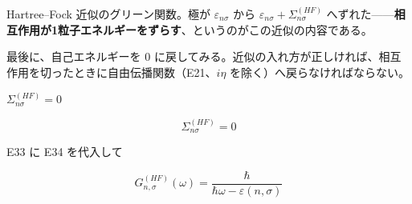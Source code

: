 \documentclass[dvipdfmx,a4paper,11pt]{jsarticle}
\begin{document}
Hartree–Fock 近似のグリーン関数。極が $\varepsilon_{n\sigma}$ から $\varepsilon_{n\sigma}+\Sigma^{(HF)}_{n\sigma}$ へずれた——\textbf{相互作用が1粒子エネルギーをずらす}、というのがこの近似の内容である。

最後に、自己エネルギーを 0 に戻してみる。近似の入れ方が正しければ、相互作用を切ったときに自由伝播関数（E21、$i\eta$ を除く）へ戻らなければならない。

$\Sigma^{(HF)}_{n\sigma} = 0$

\begin{equation}
  \Sigma^{(HF)}_{n\sigma} = 0
  \label{eq:E34}
\end{equation}

E33 に E34 を代入して

\begin{equation}
  G^{(HF)}_{n,\sigma}(\omega) = \frac{\hbar}{\hbar \omega-\varepsilon\left(n , \sigma\right)}
  \label{eq:E35}
\end{equation}
\end{document}
